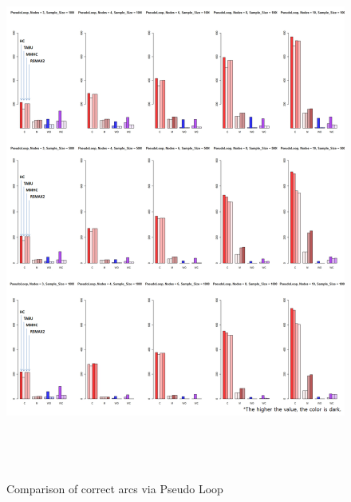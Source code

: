 	\begin{figure}[p]
	\centering
		\includegraphics[height=500pt]{images/04_PseudoLoop_Arcs}
		\caption{Comparison of correct arcs via Pseudo Loop}
	\end{figure}	
